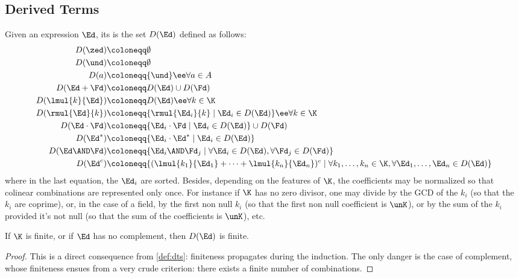 \documentclass[a4paper,USenglish]{lipics}
\begin{document}
\subsection{Derived Terms}
\label{sec:der-terms}
\begin{Definition}
  \label{def:dts}
  Given an expression $\Ed$, its  is the set $D(\Ed)$
  defined as follows:
  \begin{align*}
    D(\zed) &\coloneqq \emptyset \\
    D(\und) &\coloneqq \emptyset \\
    D(a)    &\coloneqq \{\und\} \ee \forall a \in A\\
    D(\Ed + \Fd) &\coloneqq D(\Ed) \cup D(\Fd) \\
    D(\lmul{k}{\Ed}) &\coloneqq D(\Ed) \ee \forall k \in \K \\
    D(\rmul{\Ed}{k}) &\coloneqq \{\rmul{\Ed_i}{k} \mid \Ed_i \in D(\Ed)\}  \ee \forall k \in \K \\
    D(\Ed\cdot \Fd) &\coloneqq  \{\Ed_i\cdot\Fd \mid \Ed_i \in D(\Ed)\} \cup D(\Fd) \\
    D(\Ed^*) &\coloneqq  \{\Ed_i\cdot\Ed^* \mid \Ed_i \in D(\Ed)\} \\
    D(\Ed\AND \Fd)
    &\coloneqq \{\Ed_i \AND \Fd_j \mid \forall \Ed_i \in D(\Ed), \forall \Fd_j\in D(\Fd)\}
    \\
    D(\Ed^c)
    &\coloneqq \{(\lmul{k_1}{\Ed_1} + \cdots + \lmul{k_n}{\Ed_n})^c \mid \forall k_1, \ldots, k_n \in \K, \forall \Ed_1, \ldots, \Ed_n \in D(\Ed)\}
  \end{align*}
  \noindent where in the last equation, the $\Ed_i$ are sorted.  Besides,
  depending on the features of $\K$, the coefficients may be normalized so
  that colinear combinations are represented only once.  For instance if
  $\K$ has no zero divisor, one may divide by the GCD of the $k_i$ (so that
  the $k_i$ are coprime), or, in the case of a field, by the first non null
  $k_i$ (so that the first non null coefficient is $\unK$), or by the sum of
  the $k_i$ provided it's not null (so that the sum of the coefficients is
  $\unK$), etc.
\end{Definition}

\begin{theorem}
  If $\K$ is finite, or if $\Ed$ has no complement, then $D(\Ed)$ is finite.
\end{theorem}

\begin{proof}
  This is a direct consequence from \cref{def:dts}: finiteness propagates
  during the induction.  The only danger is the case of complement, whose
  finiteness ensues from a very crude criterion: there exists a finite
  number of combinations.
\end{proof}
\end{document}

